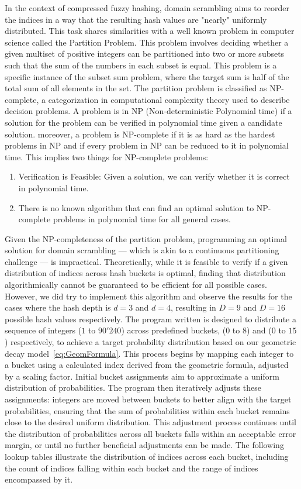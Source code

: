 In the context of compressed fuzzy hashing, domain scrambling aims to reorder the indices in a way that the resulting hash values are "nearly" uniformly distributed. This task shares similarities with a well known problem in computer science called the Partition Problem\cite{ref6}. This problem involves deciding whether a given multiset of positive integers can be partitioned into two or more subsets such that the sum of the numbers in each subset is equal. This problem is a specific instance of the subset sum problem, where the target sum is half of the total sum of all elements in the set. The partition problem is classified as NP-complete, a categorization in computational complexity theory used to describe decision problems. A problem is in NP (Non-deterministic Polynomial time) if a solution for the problem can be verified in polynomial time given a candidate solution. moreover, a problem is NP-complete if it is as hard as the hardest problems in NP and if every problem in NP can be reduced to it in polynomial time. This implies two things for NP-complete problems:

\begin{enumerate}
    \item Verification is Feasible: Given a solution, we can verify whether it is correct in polynomial time.
    \item There is no known algorithm that can find an optimal solution to NP-complete problems in polynomial time for all general cases.
\end{enumerate}

Given the NP-completeness of the partition problem, programming an optimal solution for domain scrambling — which is akin to a continuous partitioning challenge — is impractical. Theoretically, while it is feasible to verify if a given distribution of indices across hash buckets is optimal, finding that distribution algorithmically cannot be guaranteed to be efficient for all possible cases. However, we did try to implement this algorithm and observe the results for the cases where the hash depth is \(d = 3\) and \(d = 4\), resulting in \(D = 9\) and \(D = 16\) possible hash values respectively. The program written is designed to distribute a sequence of integers (\(1\) to \(90'240\)) across predefined buckets, (\(0\) to \(8\)) and (\(0\) to \(15\)) respectively, to achieve a target probability distribution based on our geometric decay model~\ref{eq:GeomFormula}. This process begins by mapping each integer to a bucket using a calculated index derived from the geometric formula, adjusted by a scaling factor. Initial bucket assignments aim to approximate a uniform distribution of probabilities. The program then iteratively adjusts these assignments: integers are moved between buckets to better align with the target probabilities, ensuring that the sum of probabilities within each bucket remains close to the desired uniform distribution. This adjustment process continues until the distribution of probabilities across all buckets falls within an acceptable error margin, or until no further beneficial adjustments can be made. The following lookup tables illustrate the distribution of indices across each bucket, including the count of indices falling within each bucket and the range of indices encompassed by it.

